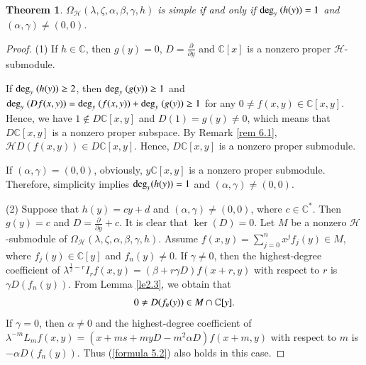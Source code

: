 \documentclass[12pt,reqno]{amsart}
\def\C{\mathbb{C}}
\numberwithin{equation}{section}
\newtheorem{theo}{Theorem}[section]
\begin{document}
\begin{theo}\label{prop 6.1}
    $\Omega_{\mathcal{H}}(\lambda,\zeta,\alpha,\beta,\gamma,h)$ is simple if and only if ${\rm deg}_y\ (h(y))=1$ and $(\alpha,\gamma)\neq(0,0)$.
\end{theo}
\begin{proof}
\rm(1) 
If $h\in\C$, then $g(y)=0$, $D=\frac{\partial}{\partial{y}}$ and $\C[x]$ is a nonzero proper $\mathcal{H}$-submodule. 

If ${\rm deg}_y\ (h(y))\ge 2$, then ${\rm deg}_y\ (g(y))\ge 1 $ and $ {\rm deg}_y\ (Df(x,y))={\rm deg}_y\ (f(x,y))+{\rm deg}_y\ (g(y)) \ge 1$ for any $0\neq f(x,y)\in\C[x,y]$. Hence, we have $1\notin D\C[x,y]$ and $D(1)=g(y)\neq 0$, which means that $D\C[x,y]$ is a nonzero proper subspace. By Remark \ref{rem 6.1}, $\mathcal{H}D(f(x,y))\in D\C[x,y]$. Hence,
$D\C[x,y]$ is a nonzero proper submodule.

If $(\alpha,\gamma)=(0,0)$, 
obviously, $y\C[x,y]$ is a nonzero proper submodule.
Therefore, simplicity implies  ${\rm deg}_y(h(y))=1$ and $(\alpha,\gamma)\neq (0,0)$.

\rm(2) Suppose that $h(y)=cy+d$ and $(\alpha,\gamma)\neq (0,0)$, where $c\in\C^*$. Then $g(y)=c$ and $D=\frac{\partial}{\partial{y}}+c$. It is clear that $\ker(D)= {0}$. Let $M$ be a nonzero $\mathcal{H}$-submodule of $\Omega_{\mathcal{H}}(\lambda,\zeta,\alpha,\beta,\gamma,h)$. Assume $f(x,y)=\sum_{j=0}^nx^jf_j(y)\in M$, where $f_j(y)\in \C[y]$ and $f_n(y)\neq 0$.
If $\gamma\neq 0$, then the highest-degree coefficient of $\lambda^{\frac{1}{2}-r}I_{r}f(x,y)=(\beta+r\gamma D)f(x+r,y)$
with respect to $r$ is $\gamma D(f_n(y))$. From Lemma \ref{le2.3}, we obtain that
 \begin{equation}\label{formula 5.2}
\aligned
0\neq  D(f_n(y))\in M\cap \C[y].
\endaligned
\end{equation} 
If $\gamma=0$, then $\alpha\neq 0$ and the highest-degree coefficient of $\lambda^{-m}L_mf(x,y)=(x+ms+myD-m^2\alpha D)f(x+m,y)$
with respect to $m$ is $-\alpha D(f_n(y))$. Thus (\ref{formula 5.2}) also holds in this case.



\end{proof}
\end{document}
